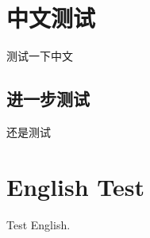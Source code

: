 \documentclass{article}
\begin{document}
	\section{中文测试}
		测试一下中文
		\subsection{进一步测试}
			还是测试
	\section{English Test}
			Test English.
\end{document}
